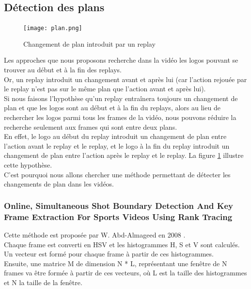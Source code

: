 \documentclass[11pt]{article}
\begin{document}
\subsection{Détection des plans}
\label{sec:org704a801}
\begin{figure}[htbp]
\centering
\texttt{[image: plan.png]}
\caption{Changement de plan introduit par un replay \label{plan}}
\end{figure}

Les approches que nous proposons recherche dans la vidéo les logos pouvant se trouver au début et à la fin des replays.\\
Or, un replay introduit un changement avant et après lui (car l'action rejouée par le replay n'est pas sur le même plan que l'action avant et après lui).\\
Si nous faisons l'hypothèse qu'un replay entraînera toujours un changement de plan et que les logos sont au début et à la fin du replays, alors au lieu de rechercher les logos parmi tous les frames de la vidéo, nous pouvons réduire la recherche seulement aux frames qui sont entre deux plans.\\
En effet, le logo au début du replay introduit un changement de plan entre l'action avant le replay et le replay, et le logo à la fin du replay introduit un changement de plan entre l'action après le replay et le replay. La figure \ref{plan} illustre cette hypothèse.\\

C'est pourquoi nous allons chercher une méthode permettant de détecter les changements de plan dans les vidéos.\\

\subsubsection{Online, Simultaneous Shot Boundary Detection And Key Frame Extraction For Sports Videos Using Rank Tracing}
\label{sec:org4334530}
Cette méthode est proposée par W. Abd-Almageed en 2008 \cite{Abd_Almageed_2008}.\\

Chaque frame est converti en HSV et les histogrammes H, S et V sont calculés.\\
Un vecteur est formé pour chaque frame à partir de ces histogrammes.\\
Ensuite, une matrice M de dimension N * L, représentant une fenêtre de N frames va être formée à partir de ces vecteurs, où L est la taille des histogrammes et N la taille de la fenêtre.\\
\end{document}
